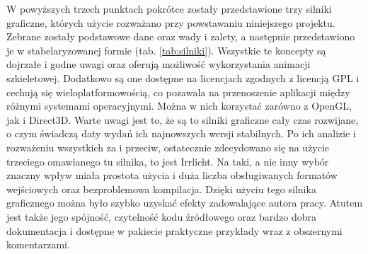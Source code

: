 \documentclass[11pt]{mwrep}
\begin{document}
      W powyższych trzech punktach pokrótce zostały przedstawione trzy silniki graficzne, których użycie rozważano przy powstawaniu niniejszego projektu. Zebrane zostały podstawowe dane oraz wady i zalety, a następnie przedstawiono je w stabelaryzowanej formie (tab. \ref{tab:silniki}). Wszystkie te koncepty są dojrzałe i godne uwagi oraz oferują możliwość wykorzystania animacji szkieletowej. Dodatkowo są one dostępne na licencjach zgodnych z licencją GPL i cechują się wieloplatformowością, co pozawala na przenoszenie aplikacji między różnymi systemami operacyjnymi. Można w nich korzystać zarówno z OpenGL, jak i Direct3D. Warte uwagi jest to, że są to silniki graficzne cały czas rozwijane, o czym świadczą daty wydań ich najnowszych wersji stabilnych. Po ich analizie i rozważeniu wszystkich za i przeciw, ostatecznie zdecydowano się na użycie trzeciego omawianego tu silnika, to jest Irrlicht. Na taki, a nie inny wybór znaczny wpływ miała prostota użycia i duża liczba obsługiwanych formatów wejściowych oraz bezproblemowa kompilacja. Dzięki użyciu tego silnika graficznego można było szybko uzyskać efekty zadowalające autora pracy. Atutem jest także jego spójność, czytelność kodu źródłowego oraz bardzo dobra dokumentacja i dostępne w pakiecie praktyczne przykłady wraz z obszernymi komentarzami.
\end{document}

